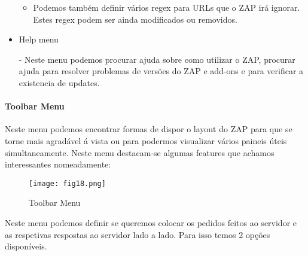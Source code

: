 \begin{itemize}
\begin{itemize}
\item Podemos também definir vários regex para URLs que o ZAP irá ignorar. Estes regex podem ser ainda modificados ou removidos.
\end{itemize}

\item Help menu \newline


\par - Neste menu podemos procurar ajuda sobre como utilizar o ZAP, procurar ajuda para resolver problemas de versões do ZAP e add-ons e para verificar a existencia de updates.\newline

\end{itemize}

\paragraph{Toolbar Menu} \hfill\newline
\hfill\newline
\par Neste menu podemos encontrar formas de dispor o layout do ZAP para que se torne mais agradável á vista ou para podermos visualizar vários paineis úteis simultaneamente. Neste menu destacam-se algumas features que achamos interessantes nomeadamente:\newline

\begin{figure}[H]

  \centering

  \texttt{[image: fig18.png]}

  \caption{Toolbar Menu}

\end{figure}

\par Neste menu podemos definir se queremos colocar os pedidos feitos ao servidor e as respetivas respostas ao servidor lado a lado. Para isso temos 2 opções disponíveis.



